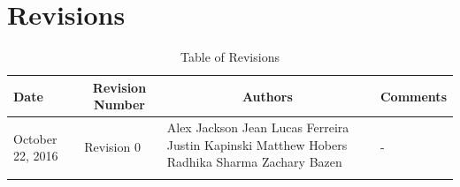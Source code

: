 \documentclass [12pt]{article}
\begin{document}
																																											\pagebreak

																																											\tableofcontents
																																											\listoftables

																																											\pagebreak


																																											\section{Revisions}
																																											\begin{longtable}{| p{ } | p{ } | p{ } | p{ } |}

																																											\hline 
																																											\centering \textbf{Date} & 
																																											\multicolumn{1}{c}{\textbf {Revision Number}} &
																																											\multicolumn{1}{|c}{\textbf {Authors}} & 
																																											\multicolumn{1}{|c|}{\textbf {Comments}} \\ \hline

																																											\multirow{4}{*}{\centering October 22, 2016}  & 
																																											\multirow{4}{*}{Revision 0}& 
																																											{Alex Jackson \newline
																																													Jean Lucas Ferreira \newline
																																															Justin Kapinski\newline
																																																	Matthew Hobers\newline
																																																			Radhika Sharma\newline
																																																					Zachary Bazen}
																																																					 &
																																																					 \multirow{4}{*}{-} \\ 
																																																					 \hline 

																																																					 \caption{Table of Revisions} 
																																																					 \end{longtable}
\end{document}
